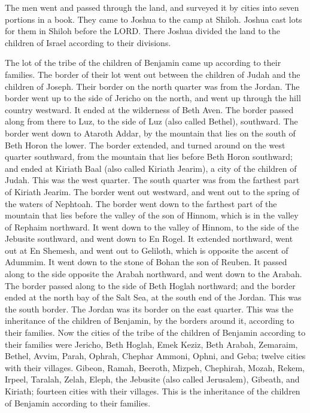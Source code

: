  The men went and passed through the land, and surveyed it
by cities into seven portions in a book. They came to Joshua to the camp
at Shiloh.  Joshua cast lots for them in Shiloh before the
LORD. There Joshua divided the land to the children of Israel according
to their divisions.

 The lot of the tribe of the children of Benjamin came up
according to their families. The border of their lot went out between
the children of Judah and the children of Joseph.  Their
border on the north quarter was from the Jordan. The border went up to
the side of Jericho on the north, and went up through the hill country
westward. It ended at the wilderness of Beth Aven.  The
border passed along from there to Luz, to the side of Luz (also called
Bethel), southward. The border went down to Ataroth Addar, by the
mountain that lies on the south of Beth Horon the lower. 
The border extended, and turned around on the west quarter southward,
from the mountain that lies before Beth Horon southward; and ended at
Kiriath Baal (also called Kiriath Jearim), a city of the children of
Judah. This was the west quarter.  The south quarter was
from the farthest part of Kiriath Jearim. The border went out westward,
and went out to the spring of the waters of Nephtoah.  The
border went down to the farthest part of the mountain that lies before
the valley of the son of Hinnom, which is in the valley of Rephaim
northward. It went down to the valley of Hinnom, to the side of the
Jebusite southward, and went down to En Rogel.  It extended
northward, went out at En Shemesh, and went out to Geliloth, which is
opposite the ascent of Adummim. It went down to the stone of Bohan the
son of Reuben.  It passed along to the side opposite the
Arabah northward, and went down to the Arabah.  The border
passed along to the side of Beth Hoglah northward; and the border ended
at the north bay of the Salt Sea, at the south end of the Jordan. This
was the south border.  The Jordan was its border on the
east quarter. This was the inheritance of the children of Benjamin, by
the borders around it, according to their families.  Now
the cities of the tribe of the children of Benjamin according to their
families were Jericho, Beth Hoglah, Emek Keziz,  Beth
Arabah, Zemaraim, Bethel,  Avvim, Parah, Ophrah,
 Chephar Ammoni, Ophni, and Geba; twelve cities with their
villages.  Gibeon, Ramah, Beeroth,  Mizpeh,
Chephirah, Mozah,  Rekem, Irpeel, Taralah, 
Zelah, Eleph, the Jebusite (also called Jerusalem), Gibeath, and
Kiriath; fourteen cities with their villages. This is the inheritance of
the children of Benjamin according to their families.

